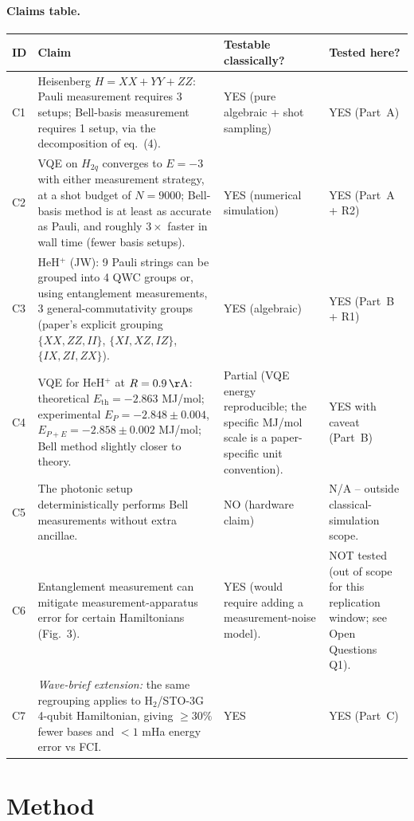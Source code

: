 \documentclass[11pt]{article}
\begin{document}
\paragraph{Claims table.}
\begin{longtable}{@{}p{}p{}p{}p{}@{}}
\toprule
ID & Claim & Testable classically? & Tested here?\\ \midrule
C1 & Heisenberg $H=XX+YY+ZZ$: Pauli measurement requires 3 setups; Bell-basis measurement requires 1 setup, via the decomposition of eq.~(4). & YES (pure algebraic + shot sampling) & YES (Part~A) \\
C2 & VQE on $H_{2q}$ converges to $E=-3$ with either measurement strategy, at a shot budget of $N=9000$; Bell-basis method is at least as accurate as Pauli, and roughly $3{\times}$ faster in wall time (fewer basis setups). & YES (numerical simulation) & YES (Part~A + R2)\\
C3 & HeH$^+$ (JW): 9 Pauli strings can be grouped into 4 QWC groups or, using entanglement measurements, 3 general-commutativity groups (paper's explicit grouping $\{XX,ZZ,II\}$, $\{XI,XZ,IZ\}$, $\{IX,ZI,ZX\}$). & YES (algebraic) & YES (Part~B + R1) \\
C4 & VQE for HeH$^+$ at $R=0.9\,\mathrm{\AA}$: theoretical $E_\mathrm{th}=-2.863$ MJ/mol; experimental $E_P=-2.848\pm 0.004$, $E_{P+E}=-2.858\pm 0.002$ MJ/mol; Bell method slightly closer to theory. & Partial (VQE energy reproducible; the specific MJ/mol scale is a paper-specific unit convention). & YES with caveat (Part~B) \\
C5 & The photonic setup deterministically performs Bell measurements without extra ancillae. & NO (hardware claim) & N/A -- outside classical-simulation scope. \\
C6 & Entanglement measurement can mitigate measurement-apparatus error for certain Hamiltonians (Fig.\ 3). & YES (would require adding a measurement-noise model). & NOT tested (out of scope for this replication window; see Open Questions Q1). \\
C7 & \emph{Wave-brief extension:} the same regrouping applies to H$_2$/STO-3G 4-qubit Hamiltonian, giving $\geq 30\%$ fewer bases and $<1$ mHa energy error vs FCI. & YES & YES (Part~C) \\
\bottomrule
\end{longtable}

\section{Method}
\end{document}
